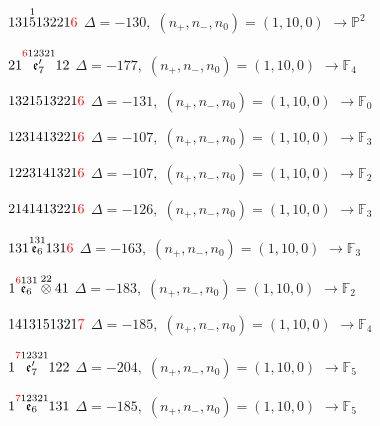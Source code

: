 \documentclass[10pt]{article}
\begin{document}
$131\overset{1}{5}13221\textcolor{red}{6}$ \quad $\Delta=-130,\; (n_+,n_-,n_0)=(1,10,0)$ \quad $\to \mathbb{P}^2$

\smallskip

$21\overset{\textcolor{red}{6}12321}{\mathfrak{e}_7'}12$ \quad $\Delta=-177,\; (n_+,n_-,n_0)=(1,10,0)$ \quad $\to \mathbb{F}_{4}$

\smallskip

$1321513221\textcolor{red}{6}$ \quad $\Delta=-131,\; (n_+,n_-,n_0)=(1,10,0)$ \quad $\to \mathbb{F}_{0}$

\smallskip

$1231413221\textcolor{red}{6}$ \quad $\Delta=-107,\; (n_+,n_-,n_0)=(1,10,0)$ \quad $\to \mathbb{F}_{3}$

$1223141321\textcolor{red}{6}$ \quad $\Delta=-107,\; (n_+,n_-,n_0)=(1,10,0)$ \quad $\to \mathbb{F}_{2}$

\smallskip

$2141413221\textcolor{red}{6}$ \quad $\Delta=-126,\; (n_+,n_-,n_0)=(1,10,0)$ \quad $\to \mathbb{F}_{3}$

\smallskip

$131\overset{131}{\mathfrak{e}_6}131\textcolor{red}{6}$ \quad $\Delta=-163,\; (n_+,n_-,n_0)=(1,10,0)$ \quad $\to \mathbb{F}_{3}$

\smallskip

$1\overset{\textcolor{red}{6}131}{\mathfrak{e}_6}\overset{22}{\otimes}41$ \quad $\Delta=-183,\; (n_+,n_-,n_0)=(1,10,0)$ \quad $\to \mathbb{F}_{2}$

\smallskip

$1413151321\textcolor{red}{7}$ \quad $\Delta=-185,\; (n_+,n_-,n_0)=(1,10,0)$ \quad $\to \mathbb{F}_{4}$

\smallskip

$1\overset{\textcolor{red}{7}12321}{\mathfrak{e}_7'}122$ \quad $\Delta=-204,\; (n_+,n_-,n_0)=(1,10,0)$ \quad $\to \mathbb{F}_{5}$

\smallskip

$1\overset{\textcolor{red}{7}12321}{\mathfrak{e}_6}131$ \quad $\Delta=-185,\; (n_+,n_-,n_0)=(1,10,0)$ \quad $\to \mathbb{F}_{5}$
\end{document}
